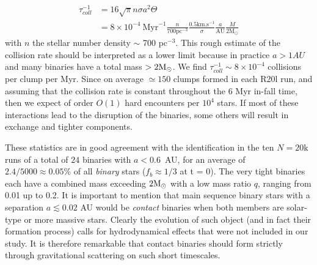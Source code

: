 \begin{align}
\tau_{coll}^{-1} &= 16 \sqrt{\pi} n \sigma a^2 \Theta \nonumber\\
			&= 8\times 10^{-4}~ \textrm{Myr}^{-1} \frac{n}{700 \textrm{pc}^{-3}} \frac{0.5 \textrm{km.s}^{-1}}{\sigma} \frac{a}{\textrm{AU}} \frac{M}{2 \textrm{M}_\odot}
\end{align}
with $n$ the stellar number density  $\sim$ 700 pc$^{-3}$. 
This rough estimate of the collision rate should be interpreted as a lower limit because in practice $a > 1 AU$ and many binaries have a total mass $> 2 {\textrm{M}_\odot}$. We find  $\tau_{coll}^{-1} \sim 8\times 10^{-4}$ collisions per clump per Myr. Since on average $\simeq 150$ clumps formed in each R20l run, and assuming that the collision rate is 
constant throughout the 6 Myr  in-fall time, then we expect of order $O(1) $  hard  encounters  per $10^4$ stars. If most of these interactions lead to  the disruption of the binaries, some others  will result in exchange and tighter components. 

These statistics are in good agreement with %
the identification                                           %
in the ten $N = 20$k runs  of a total of $24$ binaries with $a < 0.6$~AU, for an average of $2.4 / 5 000  \approx 0.05 \% $ of all {\it  binary} stars  
  ($f_b \approx 1/3$ at t = 0).  The very tight binaries each have a combined mass exceeding $2 {\textrm{M}_\odot}$ with a  low mass ratio $q$, ranging from 0.01 up to 0.2. It is important to mention that main sequence binary stars with a separation 
  $a \lesssim 0.02$ AU would be \textit{contact} binaries when both members are solar-type or more massive stars. 
  Clearly the evolution of such object (and in fact their formation process) calls for hydrodynamical effects that were not 
  included in our study. It is therefore remarkable that contact binaries should form strictly through gravitational scattering 
  on such short timescales. 
  



